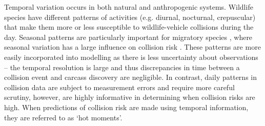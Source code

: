 %
%
%
Temporal variation occurs in both natural and anthropogenic systems. Wildlife species have different patterns of activities (e.g. diurnal, nocturnal, crepuscular) that make them more or less susceptible to wildlife-vehicle collisions during the day. Seasonal patterns are particularly important for migratory species \citep{hick85,bern92}, where seasonal variation has a large influence on collision risk \citep{shep08}. These patterns are more easily incorporated into modelling as there is less uncertainty about observations -- the temporal resolution is large and thus discrepancies in time between a collision event and carcass discovery are negligible. In contrast, daily patterns in collision data are subject to measurement errors and require more careful scrutiny, however, are highly informative in determining when collision risks are high. When predictions of collision risk are made using temporal information, they are referred to as `hot moments'.

